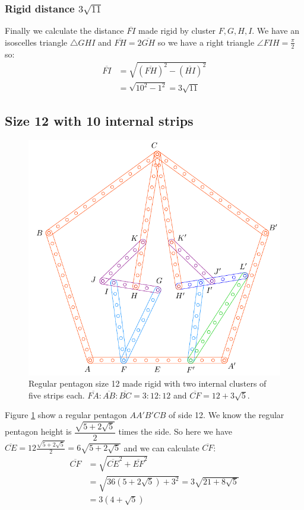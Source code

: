 \documentclass[11pt]{article}
\begin{document}
\subsubsection{Rigid distance $3\sqrt{11}$}

Finally we calculate the distance $\overline{FI}$ made rigid by cluster $F,G,H,I$. We have an isoscelles triangle $\triangle{GHI}$ and $\overline{FH}=2\overline{GH}$ so we have a right triangle $\angle{FIH}=\frac{\pi}2$ so: \begin{align}
\overline{FI} &= \sqrt{(\overline{FH})^2 - (\overline{HI})^2}\nonumber\\
 &= \sqrt{10^2 - 1^2} = 3\sqrt{11}
\end{align}


\subsection{Size 12 with 10 internal strips}

\begin{figure}[H]
 \centering
 \includegraphics[scale=0.80]{12/penta12-10a}
 \caption{Regular pentagon size 12 made rigid with two internal clusters of five strips each.  $\overline{FA}:\overline{AB}:\overline{BC} = 3:12:12$ and $\overline{CF} = 12 + 3\sqrt5$.}
 \label{fig:penta12-10a}
\end{figure}

Figure \ref{fig:penta12-10a} show a regular pentagon $AA'B'CB$ of side 12. We know the regular pentagon height is $\dfrac{\sqrt{5+2\sqrt5}}2$ times the side. So here we have $\overline{CE} = 12\frac{\sqrt{5+2\sqrt5}}2 = 6\sqrt{5+2\sqrt5}$ and we can calculate $\overline{CF}$:
\begin{align}
\overline{CF} &= \sqrt{\overline{CE}^2 + \overline{EF}^2}\nonumber\\
 &= \sqrt{36(5+2\sqrt5) + 3^2} = 3\sqrt{21+8\sqrt5} \nonumber\\
 &= 3(4 + \sqrt5)
\end{align}
\end{document}
